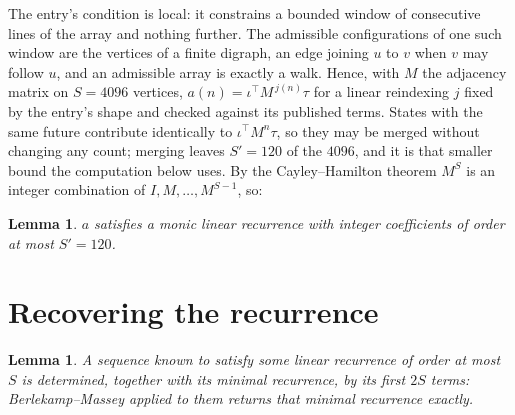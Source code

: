 \documentclass[11pt,a4paper]{article}
\theoremstyle{plain}
\newtheorem{lemma}[theorem]{Lemma}
\theoremstyle{definition}
\begin{document}
The entry's condition is local: it constrains a bounded window of consecutive lines of the
array and nothing further. The admissible configurations of one such window are the vertices
of a finite digraph, an edge joining $u$ to $v$ when $v$ may follow $u$, and an admissible
array is exactly a walk. Hence, with $M$ the adjacency matrix on $S=4096$ vertices,
$a(n)=\iota^{\!\top}M^{\,j(n)}\tau$ for a linear reindexing $j$ fixed by the entry's shape
and checked against its published terms. States with the same future contribute identically to $\iota^{\!\top}M^n\tau$, so they may be merged without changing any count; merging leaves $S'=120$ of the $4096$, and it is that smaller bound the computation below uses. By the Cayley--Hamilton theorem $M^{S}$ is an
integer combination of $I,M,\dots,M^{S-1}$, so:

\begin{lemma}\label{lem:cf}
$a$ satisfies a monic linear recurrence with integer coefficients of order at most
$S'=120$.
\end{lemma}

\section{Recovering the recurrence}

\begin{lemma}\label{lem:bm}
A sequence known to satisfy some linear recurrence of order at most $S$ is determined, together
with its minimal recurrence, by its first $2S$ terms: Berlekamp--Massey applied to them returns
that minimal recurrence exactly.
\end{lemma}
\end{document}
